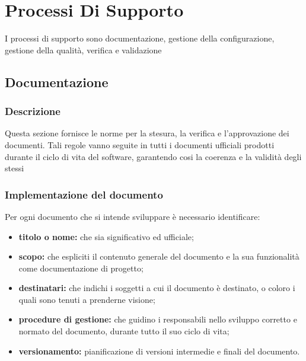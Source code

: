 \chapter{Processi Di Supporto}\label{ProcessiDiSupporto}
I processi di supporto sono documentazione, gestione della configurazione, gestione della qualità, verifica e validazione
\section{Documentazione}\label{3.1}
\subsection{Descrizione}\label{3.1.1}
Questa sezione fornisce le norme per la stesura, la verifica e l'approvazione dei documenti. Tali regole vanno seguite in tutti i documenti ufficiali prodotti durante il ciclo di vita del software, garantendo cosi la coerenza e la validità degli stessi
\subsection{Implementazione del documento}\label{3.1.2}
 Per ogni documento che si intende sviluppare è necessario identificare:
\begin{itemize}
\item \textbf {titolo o nome:} che sia significativo ed ufficiale;
	\item \textbf {scopo:} che espliciti il contenuto generale del documento e la sua funzionalità come 		documentazione di progetto;
		\item \textbf {destinatari:} che indichi i soggetti a cui il documento è destinato, o coloro i quali sono tenuti a prenderne visione;
			\item \textbf {procedure di gestione:} che guidino i responsabili nello sviluppo corretto e normato del documento, durante tutto il suo ciclo di vita;
				\item \textbf {versionamento:} pianificazione di versioni intermedie e finali del documento.
\end{itemize}
